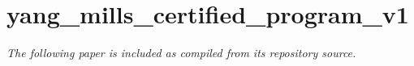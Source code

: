 \chapter{yang\_mills\_certified\_program\_v1}
\emph{The following paper is included as compiled from its repository source.}

